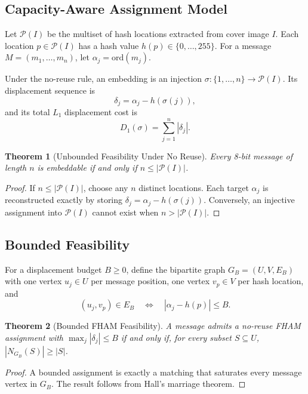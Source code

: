 \documentclass[preprint,12pt]{elsarticle}
\theoremstyle{plain}
\newtheorem{theorem}{Theorem}
\begin{document}
\subsection{Capacity-Aware Assignment Model}

Let $\mathcal{P}(I)$ be the multiset of hash locations extracted from cover
image $I$. Each location $p\in\mathcal{P}(I)$ has a hash value
$h(p)\in\{0,\ldots,255\}$. For a message
$M=(m_1,\ldots,m_n)$, let $\alpha_j=\mathrm{ord}(m_j)$.

Under the no-reuse rule, an embedding is an injection
$\sigma:\{1,\ldots,n\}\rightarrow\mathcal{P}(I)$. Its displacement sequence is
\begin{equation}
    \delta_j=\alpha_j-h(\sigma(j)),
\end{equation}
and its total $L_1$ displacement cost is
\begin{equation}
    D_1(\sigma)=\sum_{j=1}^{n}|\delta_j|.
\end{equation}

\begin{theorem}[Unbounded Feasibility Under No Reuse]
\label{thm:feasibility}
Every 8-bit message of length $n$ is embeddable if and only if
$n\leq|\mathcal{P}(I)|$.
\end{theorem}
\begin{proof}
If $n\leq|\mathcal{P}(I)|$, choose any $n$ distinct locations. Each target
$\alpha_j$ is reconstructed exactly by storing
$\delta_j=\alpha_j-h(\sigma(j))$. Conversely, an injective assignment into
$\mathcal{P}(I)$ cannot exist when $n>|\mathcal{P}(I)|$.
\end{proof}

\subsection{Bounded Feasibility}

For a displacement budget $B\geq0$, define the bipartite graph
$G_B=(U,V,E_B)$ with one vertex $u_j\in U$ per message position, one vertex
$v_p\in V$ per hash location, and
\begin{equation}
    (u_j,v_p)\in E_B \quad\Longleftrightarrow\quad
    |\alpha_j-h(p)|\leq B.
\end{equation}

\begin{theorem}[Bounded FHAM Feasibility]
\label{thm:bounded_feasibility}
A message admits a no-reuse FHAM assignment with
$\max_j|\delta_j|\leq B$ if and only if, for every subset $S\subseteq U$,
$|N_{G_B}(S)|\geq|S|$.
\end{theorem}
\begin{proof}
A bounded assignment is exactly a matching that saturates every message vertex
in $G_B$. The result follows from Hall's marriage theorem.
\end{proof}
\end{document}

